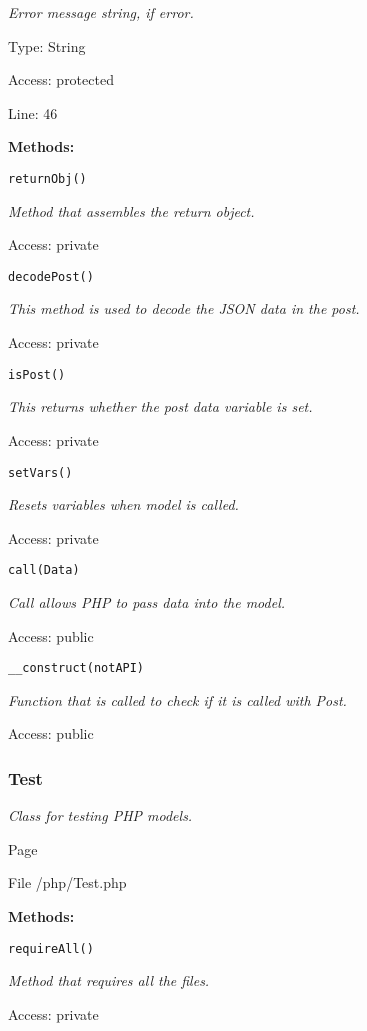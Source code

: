 {\scriptsize
\textit{Error message string, if error.}

Type: String

Access: protected

Line: 46

}
\textbf{Methods:}

\texttt{returnObj()}

{\scriptsize
\textit{Method that assembles the return object.}

Access: private

}

\texttt{decodePost()}

{\scriptsize
\textit{This method is used to decode the JSON data in the post.}

Access: private

}

\texttt{isPost()}

{\scriptsize
\textit{This returns whether the post data variable is set.}

Access: private

}

\texttt{setVars()}

{\scriptsize
\textit{Resets variables when model is called.}

Access: private

}

\texttt{call(Data)}

{\scriptsize
\textit{Call allows PHP to pass data into the model.}

Access: public

}

\texttt{\_\_construct(notAPI)}

{\scriptsize
\textit{Function that is called to check if it is called with Post.}

Access: public

}

\subsubsection{Test}
\textit{Class for testing PHP models.}

Page \pageref{Test.php}

File /php/Test.php

\textbf{Methods:}

\texttt{requireAll()}

{\scriptsize
\textit{Method that requires all the files.}

Access: private

}

